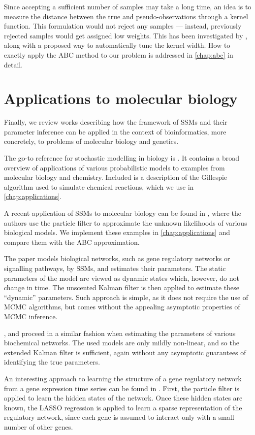 Since accepting a sufficient number of samples may take a long time, an idea is to measure the distance between the true and pseudo-observations through a kernel function. This formulation would not reject any samples --- instead, previously rejected samples would get assigned low weights. This has been investigated by \cite{dedecius}, along with a proposed way to automatically tune the kernel width. How to exactly apply the ABC method to our problem is addressed in \autoref{chap:abc} in detail.

\section{Applications to molecular biology}
Finally, we review works describing how the framework of SSMs and their parameter inference can be applied in the context of bioinformatics, more concretely, to problems of molecular biology and genetics.

The go-to reference for stochastic modelling in biology is \cite{wilkinson-book}. It contains a broad overview of applications of various probabilistic models to examples from molecular biology and chemistry. Included is a description of the Gillespie algorithm \cite{gillespie1, gillespie2} used to simulate chemical reactions, which we use in \autoref{chap:applications}.

A recent application of SSMs to molecular biology can be found in \cite{wilkinson}, where the authors use the particle filter to approximate the unknown likelihoods of various biological models. We implement these examples in \autoref{chap:applications} and compare them with the ABC approximation.

The paper \cite{bio1} models biological networks, such as gene regulatory networks or signalling pathways, by SSMs, and estimates their parameters. The static parameters of the model are viewed as dynamic states which, however, do not change in time. The unscented Kalman filter is then applied to estimate these ``dynamic'' parameters. Such approach is simple, as it does not require the use of MCMC algorithms, but comes without the appealing asymptotic properties of MCMC inference.

\cite{bio2}, \cite{bio3} and \cite{bio4} proceed in a similar fashion when estimating the parameters of various biochemical networks. The used models are only mildly non-linear, and so the extended Kalman filter is sufficient, again without any asymptotic guarantees of identifying the true parameters.

An interesting approach to learning the structure of a gene regulatory network from a gene expression time series can be found in \cite{bio5}. First, the particle filter is applied to learn the hidden states of the network. Once these hidden states are known, the LASSO regression is applied to learn a sparse representation of the regulatory network, since each gene is assumed to interact only with a small number of other genes.
